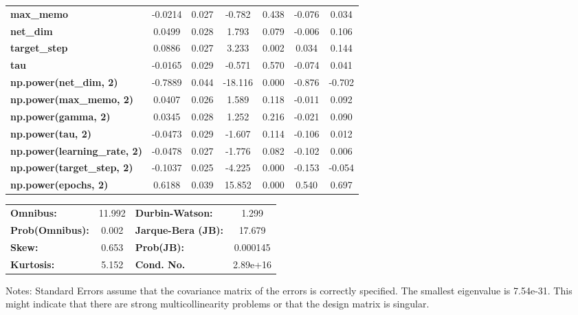 \begin{center}
\begin{tabular}{lcccccc}
\textbf{max\_memo}                   &      -0.0214  &        0.027     &    -0.782  &         0.438        &       -0.076    &        0.034     \\
\textbf{net\_dim}                    &       0.0499  &        0.028     &     1.793  &         0.079        &       -0.006    &        0.106     \\
\textbf{target\_step}                &       0.0886  &        0.027     &     3.233  &         0.002        &        0.034    &        0.144     \\
\textbf{tau}                         &      -0.0165  &        0.029     &    -0.571  &         0.570        &       -0.074    &        0.041     \\
\textbf{np.power(net\_dim, 2)}       &      -0.7889  &        0.044     &   -18.116  &         0.000        &       -0.876    &       -0.702     \\
\textbf{np.power(max\_memo, 2)}      &       0.0407  &        0.026     &     1.589  &         0.118        &       -0.011    &        0.092     \\
\textbf{np.power(gamma, 2)}          &       0.0345  &        0.028     &     1.252  &         0.216        &       -0.021    &        0.090     \\
\textbf{np.power(tau, 2)}            &      -0.0473  &        0.029     &    -1.607  &         0.114        &       -0.106    &        0.012     \\
\textbf{np.power(learning\_rate, 2)} &      -0.0478  &        0.027     &    -1.776  &         0.082        &       -0.102    &        0.006     \\
\textbf{np.power(target\_step, 2)}   &      -0.1037  &        0.025     &    -4.225  &         0.000        &       -0.153    &       -0.054     \\
\textbf{np.power(epochs, 2)}         &       0.6188  &        0.039     &    15.852  &         0.000        &        0.540    &        0.697     \\
\bottomrule
\end{tabular}
\begin{tabular}{lclc}
\textbf{Omnibus:}       & 11.992 & \textbf{  Durbin-Watson:     } &    1.299  \\
\textbf{Prob(Omnibus):} &  0.002 & \textbf{  Jarque-Bera (JB):  } &   17.679  \\
\textbf{Skew:}          &  0.653 & \textbf{  Prob(JB):          } & 0.000145  \\
\textbf{Kurtosis:}      &  5.152 & \textbf{  Cond. No.          } & 2.89e+16  \\
\bottomrule
\end{tabular}
\end{center}

Notes: \newline
 [1] Standard Errors assume that the covariance matrix of the errors is correctly specified. \newline
 [2] The smallest eigenvalue is 7.54e-31. This might indicate that there are \newline
 strong multicollinearity problems or that the design matrix is singular.